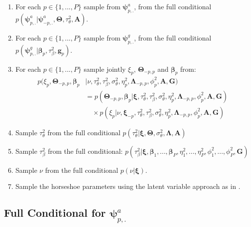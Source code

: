 \documentclass[
]{article}
\providecommand{\tightlist}{%
  \setlength{\itemsep}{0pt}\setlength{\parskip}{0pt}}
\begin{document}
\begin{enumerate}
\def\labelenumi{\arabic{enumi}.}
\tightlist
\item
  For each \(p\in\{1,...,P\}\) sample from \( {\boldsymbol \psi} ^a_{p,.}\), from the
  full conditional \(p( {\boldsymbol \psi} ^a_{p,.}| {\boldsymbol \psi} ^a_{-p,.}, {\boldsymbol \Theta} ,\tau_\theta^2, {\boldsymbol A} )\).
\item
  For each \(p\in\{1,...,P\}\) sample from \( {\boldsymbol \psi} ^g_{p,.}\), from the full
  conditional \(p( {\boldsymbol \psi} ^g_{p,.}| {\boldsymbol \beta} _p,\tau^2_\beta, {\boldsymbol g} _p)\).
\item
  For each \(p\in\{1,...,P\}\) sample jointly \(\xi_p\), \( {\boldsymbol \Theta} _{-p,p}\) and \( {\boldsymbol \beta} _p\) from:
  \begin{align*}
       p(\xi_p, {\boldsymbol \Theta} _{-p,p},  {\boldsymbol \beta} _p &|\nu,  \tau_\theta^2, \tau_\beta^2, \sigma_{\theta}^2, \eta_p^2,  {\boldsymbol \Lambda} _{-p,p}, \phi_p^2,  {\boldsymbol A} , {\boldsymbol G} ) \\
         & = p( {\boldsymbol \Theta} _{-p,p},  {\boldsymbol \beta} _p | {\boldsymbol \xi} ,  \tau_\theta^2, \tau_\beta^2, \sigma_{\theta}^2, \eta_p^2,  {\boldsymbol \Lambda} _{-p,p}, \phi_p^2,  {\boldsymbol A} , {\boldsymbol G} ) \\
         & \quad \times p(\xi_p|\nu,  {\boldsymbol \xi} _{-p}, \tau_\theta^2, \tau_\beta^2, \sigma_{\theta}^2, \eta_p^2,  {\boldsymbol \Lambda} _{-p,p}, \phi_p^2,  {\boldsymbol A} , {\boldsymbol G} )
   \end{align*}
\item
  Sample \(\tau^2_\theta\) from the full conditional
  \(p(\tau^2_\theta| {\boldsymbol \xi} , {\boldsymbol \Theta} , \sigma_{\theta}^2,  {\boldsymbol \Lambda} ,  {\boldsymbol A} )\)
\item
  Sample \(\tau^2_\beta\) from the full conditional:
  \(p(\tau^2_\beta| {\boldsymbol \xi} ,  {\boldsymbol \beta} _1,..., {\boldsymbol \beta} _P, \eta_1^2, ...,\eta_P^2, \phi_1^2, ...,\phi_P^2,  {\boldsymbol G} )\)
\item
  Sample \(\nu\) from the full conditional \(p(\nu| {\boldsymbol \xi} )\).
\item
  Sample the horseshoe parameters using the latent variable approach as in \citep{makalic_simple_2016}.
\end{enumerate}

\subsection{\texorpdfstring{Full Conditional for \( {\boldsymbol \psi} ^a_{p,.}\)}{Full Conditional for  \{\textbackslash boldsymbol \textbackslash psi\} \^{}a\_\{p,.\}}}\label{fullConditionalPsiA}
\end{document}
